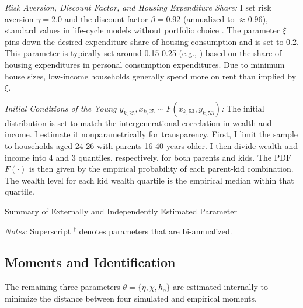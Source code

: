 \documentclass[12pt]{article}
\begin{document}

\textit{Risk Aversion, Discount Factor, and Housing Expenditure Share:} I set risk aversion  $\gamma=2.0$ and the discount factor $\beta=0.92$ (annualized to $\approx0.96$), standard values in life-cycle models without portfolio choice \citep[see e.g.,][]{Kaplan2020,Boar2018}. The parameter $\xi$ pins down the desired expenditure share of housing consumption and is set to 0.2. This parameter is typically set around 0.15-0.25 (e.g., \citealp{Kaplan2020,Chatterjee2015,Paz-Pardo2019,davis2011household}) based on the share of housing expenditures in personal consumption expenditures. Due to minimum house sizes, low-income households generally spend more on rent than implied by $\xi$.


\textit{Initial Conditions of the Young $y_{k,25},x_{k,25}\sim F(x_{k,53},y_{k,53})$:} 
The initial distribution is set to match the  intergenerational correlation in wealth and income. I estimate it nonparametrically for transparency. First, I limit the sample to households aged 24-26 with parents 16-40 years older. I then divide wealth and income into 4 and 3 quantiles, respectively, for both parents and kids. The PDF $F(\cdot)$ is then given by the empirical probability of each parent-kid combination. The wealth level for each kid wealth quartile is the empirical median within that quartile.

 
\begin{table}
	\center
	\begin{threeparttable}
		\caption{Summary of Externally and Independently Estimated Parameter}\label{tab:calpar}
		\small
		
		\footnotesize
		\textit{Notes:} Superscript $^\dagger$ denotes parameters that are bi-annualized.
	\end{threeparttable}
\end{table}


\subsection{Moments and Identification}
The remaining three parameters $\theta=\{\eta,\chi,h_o\}$ are estimated internally to minimize the distance between four simulated and empirical moments. 
\end{document}
